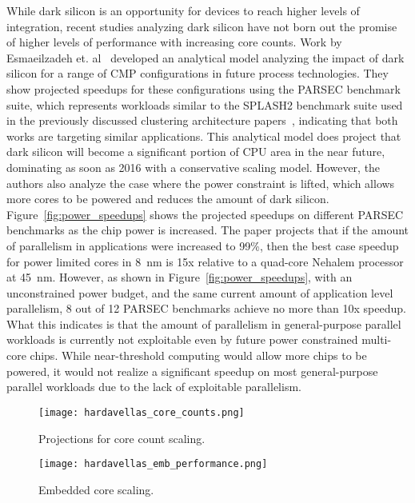 While dark silicon is an opportunity for devices to reach higher levels of
integration, recent studies analyzing dark silicon have not born out the
promise of higher levels of performance with increasing core counts.  Work by
Esmaeilzadeh et. al~\cite{Esmaeilzadeh2011Dark-silicon-an} developed an
analytical model analyzing the impact of dark silicon for a range of CMP
configurations in future process technologies. They show projected speedups for
these configurations using the PARSEC benchmark suite, which represents
workloads similar to the SPLASH2 benchmark suite used in the previously
discussed clustering architecture papers~\cite{dreslinski2010near,Zhai:2007kn},
indicating that both works are targeting similar applications. This analytical
model does project that dark silicon will become a significant portion of CPU
area in the near future, dominating as soon as 2016 with a conservative scaling
model. However, the authors also analyze the case where the power constraint is
lifted, which allows more cores to be powered and reduces the amount of dark
silicon. Figure~\ref{fig:power_speedups} shows the projected speedups on
different PARSEC benchmarks as the chip power is increased. The paper projects
that if the amount of parallelism in applications were increased to 99\%, then
the best case speedup for power limited cores in \SI{8}{\nano\meter} is 15x
relative to a quad-core Nehalem processor at \SI{45}{\nano\meter}. However, as
shown in Figure~\ref{fig:power_speedups}, with an unconstrained power budget,
and the same current amount of application level parallelism, 8 out of 12
PARSEC benchmarks achieve no more than 10x speedup.  What this indicates is
that the amount of parallelism in general-purpose parallel workloads is
currently not exploitable even by future power constrained multi-core chips.
While near-threshold computing would allow more chips to be powered, it would
not realize a significant speedup on most general-purpose parallel workloads
due to the lack of exploitable parallelism.

\begin{figure}[thpb] \centering
\texttt{[image: hardavellas\_core\_counts.png]}
\caption{Projections for core count scaling.~\cite{Hardavellas:2011de}}
\label{fig:core_counts} \end{figure}

\begin{figure}[thpb] \centering
\texttt{[image: hardavellas\_emb\_performance.png]}
\caption{Embedded core scaling.~\cite{Hardavellas:2011de}}
\label{fig:emb_performance} \end{figure}

